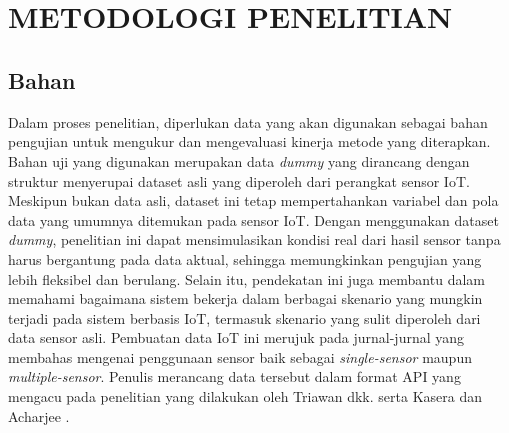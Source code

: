 \chapter[METODOLOGI PENELITIAN]{\\ METODOLOGI PENELITIAN}
\section{Bahan}
Dalam proses penelitian, diperlukan data yang akan digunakan sebagai bahan pengujian untuk mengukur dan mengevaluasi kinerja metode yang diterapkan. Bahan uji yang digunakan merupakan data \textit{dummy} yang dirancang dengan struktur menyerupai dataset asli yang diperoleh dari perangkat sensor IoT. Meskipun bukan data asli, dataset ini tetap mempertahankan variabel dan pola data yang umumnya ditemukan pada sensor IoT. Dengan menggunakan dataset \textit{dummy}, penelitian ini dapat mensimulasikan kondisi real dari hasil sensor tanpa harus bergantung pada data aktual, sehingga memungkinkan pengujian yang lebih fleksibel dan berulang. Selain itu, pendekatan ini juga membantu dalam memahami bagaimana sistem bekerja dalam berbagai skenario yang mungkin terjadi pada sistem berbasis IoT, termasuk skenario yang sulit diperoleh dari data sensor asli. Pembuatan data IoT ini merujuk pada jurnal-jurnal yang membahas mengenai penggunaan sensor baik sebagai \textit{single-sensor} maupun \textit{multiple-sensor}. Penulis merancang data tersebut dalam format API yang mengacu pada penelitian yang dilakukan oleh Triawan dkk. \cite{Triawan2023} serta Kasera dan Acharjee \cite{Kasera2024}. 

